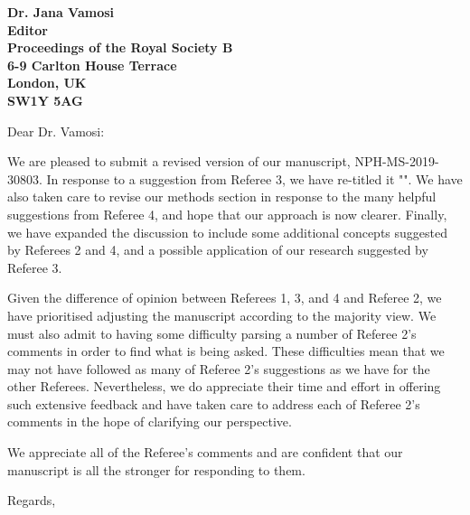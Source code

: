 \documentclass[12pt]{letter}
\begin{document}
\begin{letter}{\bf Dr. Jana Vamosi\\
               Editor\\
               Proceedings of the Royal Society B\\
               6-9 Carlton House Terrace\\
               London, UK\\
               SW1Y 5AG\\
                }

\opening{Dear Dr. Vamosi:}

	We are pleased to submit a revised version of our manuscript, NPH-MS-2019-30803. In response to a suggestion from Referee 3, we have re-titled it "". We have also taken care to revise our methods section in response to the many helpful suggestions from Referee 4, and hope that our approach is now clearer. Finally, we have expanded the discussion to include some additional concepts suggested by Referees 2 and 4, and a possible application of our research suggested by Referee 3. 


	Given the difference of opinion between Referees 1, 3, and 4 and Referee 2, we have prioritised adjusting the manuscript according to the majority view. We must also admit to having some difficulty parsing a number of Referee 2's comments in order to find what is being asked. These difficulties mean that we may not have followed as many of Referee 2's suggestions as we have for the other Referees. Nevertheless, we do appreciate their time and effort in offering such extensive feedback and have taken care to address each of Referee 2's comments in the hope of clarifying our perspective.


	We appreciate all of the Referee's comments and are confident that our manuscript is all the stronger for responding to them.


\closing{Regards,}


\end{letter}

\newpage

\setcounter{page}{1}


\end{document}
